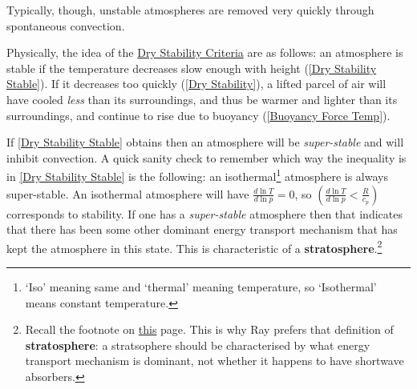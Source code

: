 Typically, though, unstable atmospheres are removed very quickly through spontaneous convection.

Physically, the idea of the \hyperref[Dry Stability Box]{Dry Stability Criteria} are as follows: an atmosphere is stable if the temperature decreases slow enough with height (\ref{Dry Stability Stable}). If it decreases too quickly (\ref{Dry Stability}), a lifted parcel of air will have cooled \textit{less} than its surroundings, and thus be warmer and lighter than its surroundings, and continue to rise due to buoyancy (\ref{Buoyancy Force Temp}).

If \ref{Dry Stability Stable} obtains then an atmosphere will be \textit{super-stable} and will inhibit convection. A quick sanity check to remember which way the inequality is in \ref{Dry Stability Stable} is the following: an isothermal\footnote{
    `Iso' meaning same and `thermal' meaning temperature, so `Isothermal' means constant temperature.
} atmosphere is always super-stable. An isothermal atmosphere will have \(\frac{d \ln T}{d \ln p} = 0\), so \(\left( \frac{d \ln T}{d \ln p} < \frac{R}{c_p} \right)\) corresponds to stability. If one has a \textit{super-stable} atmosphere then that indicates that there has been some other dominant energy transport mechanism that has kept the atmosphere in this state. This is characteristic of a \textbf{stratosphere}.\footnote{
    Recall the footnote on \hyperref[Vertical Structure]{this} page. This is why Ray prefers that definition of \textbf{stratosphere}: a stratsophere should be characterised by what energy transport mechanism is dominant, not whether it happens to have shortwave absorbers.
}

